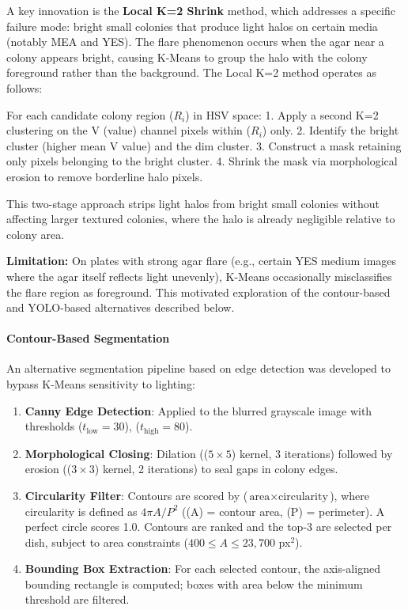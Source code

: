 A key innovation is the \textbf{Local K=2 Shrink} method, which addresses a specific failure mode: bright small colonies that produce light halos on certain media (notably MEA and YES). The flare phenomenon occurs when the agar near a colony appears bright, causing K-Means to group the halo with the colony foreground rather than the background. The Local K=2 method operates as follows:

For each candidate colony region (\(R_i\)) in HSV space: 1. Apply a second K=2 clustering on the V (value) channel pixels within (\(R_i\)) only. 2. Identify the bright cluster (higher mean V value) and the dim cluster. 3. Construct a mask retaining only pixels belonging to the bright cluster. 4. Shrink the mask via morphological erosion to remove borderline halo pixels.

This two-stage approach strips light halos from bright small colonies without affecting larger textured colonies, where the halo is already negligible relative to colony area.

\textbf{Limitation:} On plates with strong agar flare (e.g., certain YES medium images where the agar itself reflects light unevenly), K-Means occasionally misclassifies the flare region as foreground. This motivated exploration of the contour-based and YOLO-based alternatives described below.

\paragraph{Contour-Based Segmentation}\label{contour-based-segmentation}

An alternative segmentation pipeline based on edge detection was developed to bypass K-Means sensitivity to lighting:

\begin{enumerate}
\def\labelenumi{\arabic{enumi}.}
\tightlist
\item
  \textbf{Canny Edge Detection}: Applied to the blurred grayscale image with thresholds (\(t_{\text{low}} = 30\)), (\(t_{\text{high}} = 80\)).
\item
  \textbf{Morphological Closing}: Dilation (($5 \times 5$) kernel, 3 iterations) followed by erosion (($3 \times 3$) kernel, 2 iterations) to seal gaps in colony edges.
\item
  \textbf{Circularity Filter}: Contours are scored by ($\text{area} \times \text{circularity}$), where circularity is defined as \(4\pi A / P^{2}\) ((A) = contour area, (P) = perimeter). A perfect circle scores 1.0. Contours are ranked and the top-3 are selected per dish, subject to area constraints (\(400 \leq A \leq 23,700\) px\(^{2}\)).
\item
  \textbf{Bounding Box Extraction}: For each selected contour, the axis-aligned bounding rectangle is computed; boxes with area below the minimum threshold are filtered.
\end{enumerate}

